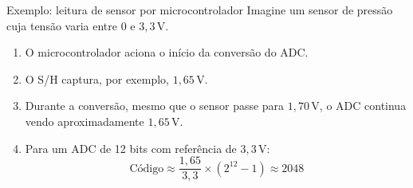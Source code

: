 \begin{frame}{Exemplo: leitura de sensor por microcontrolador}
  Imagine um sensor de pressão cuja tensão varia entre $0$ e $3{,}3\,$V.

  \begin{enumerate}
    \item O microcontrolador aciona o início da conversão do ADC.
    \item O S/H captura, por exemplo, $1{,}65\,$V.
    \item Durante a conversão, mesmo que o sensor passe para $1{,}70\,$V, o ADC continua vendo aproximadamente $1{,}65\,$V.
    \item Para um ADC de 12 bits com referência de $3{,}3\,$V:
    \[ \text{Código} \approx \frac{1{,}65}{3{,}3}\times(2^{12}-1) \approx 2048 \]
  \end{enumerate}
\end{frame}